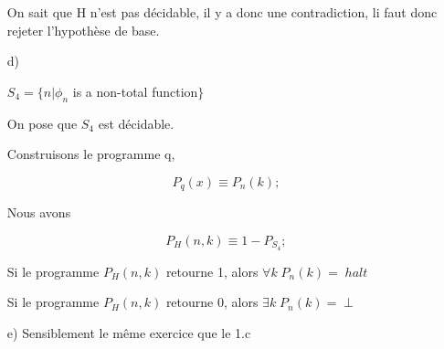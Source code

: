 \documentclass[a4paper,onecolumn,11pt]{article}
\begin{document}
\begin{itemize}
On sait que H n'est pas décidable, il y a donc une contradiction, li faut donc rejeter l'hypothèse de base.

\item[d)]

$S_4 = \{n | \phi_n$ is a non-total function$\}$

On pose que $S_4$ est décidable.

Construisons le programme q,

$$P_q(x) \equiv P_n(k);$$

Nous avons

$$P_H(n,k) \equiv 1-P_{S_4};$$

Si le programme $P_H(n,k)$ retourne 1, alors $\forall k \; P_n(k) = \; halt$

Si le programme $P_H(n,k)$ retourne 0, alors $\exists k \; P_n(k) = \perp$

\item[e)] Sensiblement le même exercice que le 1.c
\end{itemize}
\end{document}
